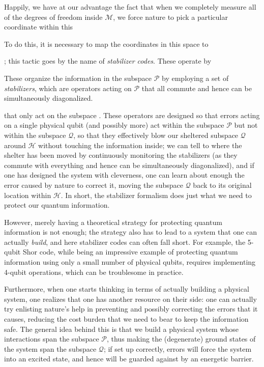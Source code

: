 \documentclass[twocolumn,showpacs,preprintnumbers,amsmath,amssymb,nofootinbib,pra,floatfix]{revtex4}
\begin{document}
  Happily, we have at our advantage the fact that when we completely measure all of the degrees of freedom inside $\mathscr{M}$, we force nature to pick a particular coordinate within this

To do this, it is necessary to map the coordinates in this space to 

;  this tactic goes by the name of  \emph{stabilizer codes}.  These operate by 

These organize the information in the subspace $\mathscr{P}$ by employing a set of \emph{stabilizers}, which are operators acting on $\mathscr{P}$ that all commute and hence can be simultaneously diagonalized.

 that only act on the subspace .  These operators are designed so that errors acting on a single physical qubit (and possibly more) act within the subspace $\mathscr{P}$ but not within the subspace $\mathscr{Q}$, so that they effectively blow our sheltered subspace $\mathscr{Q}$ around $\mathscr{H}$ without touching the information inside;  we can tell to where the shelter has been moved by continuously monitoring the stabilizers (as they commute with everything and hence can be simultaneously diagonalized), and if one has designed the system with cleverness, one can learn about enough the error caused by nature to correct it, moving the subspace $\mathscr{Q}$ back to its original location within $\mathscr{H}$.  In short, the stabilizer formalism does  just what we need to protect our quantum information.

However, merely having a theoretical strategy for protecting quantum information is not enough;  the strategy also has to lead to a system that one can actually \emph{build}, and here stabilizer codes can often fall short.  For example, the 5-qubit Shor code, while being an impressive example of protecting quantum information using only a small number of physical qubits, requires implementing 4-qubit operations, which can be troublesome in practice.

Furthermore, when one starts thinking in terms of actually building a physical system, one realizes that one has another resource on their side:  one can actually try enlisting nature's help in preventing and possibly correcting the errors that it causes, reducing the cost burden that we need to bear to keep the information safe.  The general idea behind this is that we build a physical system whose interactions span the subspace $\mathscr{P}$, thus making the (degenerate) ground states of the system span the subspace $\mathscr{Q}$;  if set up correctly, errors will force the system into an excited state, and hence will be guarded against by an energetic barrier.
\end{document}
